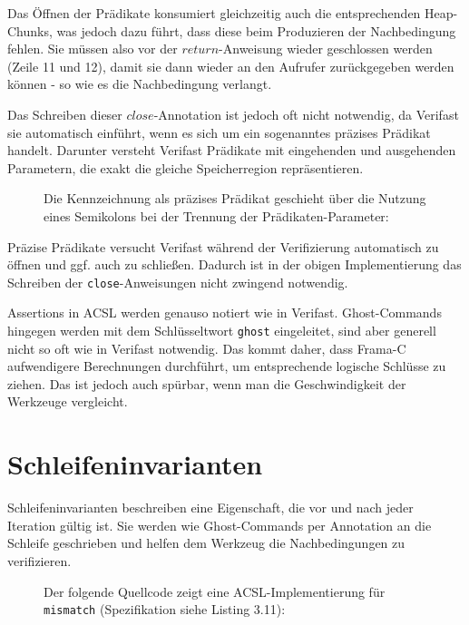 Das Öffnen der Prädikate konsumiert gleichzeitig auch die entsprechenden Heap-Chunks, was jedoch dazu führt,
dass diese beim Produzieren der Nachbedingung fehlen. Sie müssen also vor der \(return\)-Anweisung
wieder geschlossen werden (Zeile 11 und 12), damit sie dann wieder an den Aufrufer zurückgegeben werden können 
- so wie es die Nachbedingung verlangt.

Das Schreiben dieser \(close\)-Annotation ist jedoch oft nicht notwendig, da Verifast sie automatisch
einführt, wenn es sich um ein sogenanntes präzises Prädikat handelt. Darunter versteht Verifast Prädikate mit 
eingehenden und ausgehenden Parametern, die exakt die gleiche Speicherregion repräsentieren. 

\begin{figure}[H]
Die Kennzeichnung als präzises Prädikat geschieht über die Nutzung eines Semikolons bei der Trennung
der Prädikaten-Parameter:


\end{figure}
Präzise Prädikate versucht Verifast während der Verifizierung automatisch zu öffnen und ggf. auch zu
schließen. Dadurch ist in der obigen Implementierung das Schreiben der \texttt{close}-Anweisungen
nicht zwingend notwendig.

Assertions in ACSL werden genauso notiert wie in Verifast. Ghost-Commands hingegen werden
mit dem Schlüsseltwort \lstinline{ghost} eingeleitet, sind aber generell nicht so oft wie in
Verifast notwendig. Das kommt daher, dass Frama-C aufwendigere Berechnungen durchführt, um
entsprechende logische Schlüsse zu ziehen. Das ist jedoch auch spürbar, wenn man die
Geschwindigkeit der Werkzeuge vergleicht.


\section{Schleifeninvarianten}

Schleifeninvarianten beschreiben eine Eigenschaft, die vor und nach jeder Iteration gültig ist. Sie
werden wie Ghost-Commands per Annotation an die Schleife geschrieben und helfen dem Werkzeug die
Nachbedingungen zu verifizieren.

\begin{figure}[H]
Der folgende Quellcode zeigt eine ACSL-Implementierung für \lstinline{mismatch}
(Spezifikation siehe Listing 3.11):

\end{figure}

